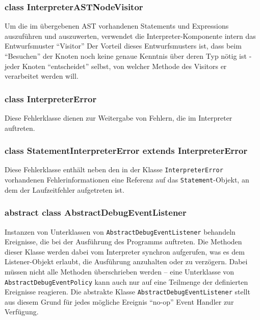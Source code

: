 \subsubsection{class InterpreterASTNodeVisitor}
Um die im übergebenen AST vorhandenen Statements und Expressions auszuführen und auszuwerten, verwendet die Interpreter-Komponente intern das Entwurfsmuster ``Visitor'' Der Vorteil dieses Entwurfsmusters ist, dass beim ``Besuchen'' der Knoten noch keine genaue Kenntnis über deren Typ nötig ist - jeder Knoten ``entscheidet'' selbst, von welcher Methode des Visitors er verarbeitet werden will.

\subsubsection{class InterpreterError}
Diese Fehlerklasse dienen zur Weitergabe von Fehlern, die im Interpreter auftreten.

\subsubsection{class StatementInterpreterError extends InterpreterError}
Diese Fehlerklasse enthält neben den in der Klasse \texttt{InterpreterError} vorhandenen Fehlerinformationen eine Referenz auf das \texttt{Statement}-Objekt, an dem der Laufzeitfehler aufgetreten ist.

\subsubsection{abstract class AbstractDebugEventListener}
Instanzen von Unterklassen von \texttt{AbstractDebugEventListener} behandeln Ereignisse, die bei der Ausführung des Programms auftreten. Die Methoden dieser Klasse werden dabei vom Interpreter synchron aufgerufen, was es dem Listener-Objekt erlaubt, die Ausführung anzuhalten oder zu verzögern. Dabei müssen nicht alle Methoden überschrieben werden -- eine Unterklasse von \texttt{AbstractDebugEventPolicy} kann auch nur auf eine Teilmenge der definierten Ereignisse reagieren. Die abstrakte Klasse \texttt{AbstractDebugEventListener} stellt aus diesem Grund für jedes mögliche Ereignis ``no-op'' Event Handler zur Verfügung.

